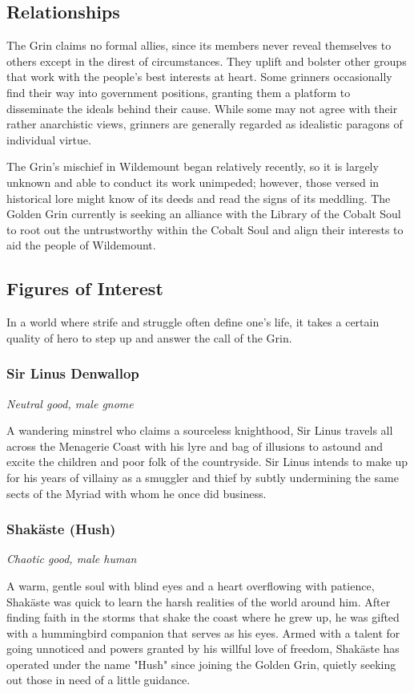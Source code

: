 \documentclass[10pt,a4paper,twoside,bg=print,twocolumn,openany,nodeprecatedcode]{dndbook}
\begin{document}
\subsection{Relationships}
The Grin claims no formal allies, since its members never reveal themselves to others except in the direst of circumstances. They uplift and bolster other groups that work with the people's best interests at heart. Some grinners occasionally find their way into government positions, granting them a platform to disseminate the ideals behind their cause. While some may not agree with their rather anarchistic views, grinners are generally regarded as idealistic paragons of individual virtue.

The Grin's mischief in Wildemount began relatively recently, so it is largely unknown and able to conduct its work unimpeded; however, those versed in historical lore might know of its deeds and read the signs of its meddling. The Golden Grin currently is seeking an alliance with the Library of the Cobalt Soul to root out the untrustworthy within the Cobalt Soul and align their interests to aid the people of Wildemount.

\subsection{Figures of Interest}
In a world where strife and struggle often define one's life, it takes a certain quality of hero to step up and answer the call of the Grin.

\subsubsection{Sir Linus Denwallop}
\textit{Neutral good, male gnome}

A wandering minstrel who claims a sourceless knighthood, Sir Linus travels all across the Menagerie Coast with his lyre and bag of illusions to astound and excite the children and poor folk of the countryside. Sir Linus intends to make up for his years of villainy as a smuggler and thief by subtly undermining the same sects of the Myriad with whom he once did business.

\subsubsection{Shakäste (Hush)}
\textit{Chaotic good, male human}

A warm, gentle soul with blind eyes and a heart overflowing with patience, Shakäste was quick to learn the harsh realities of the world around him. After finding faith in the storms that shake the coast where he grew up, he was gifted with a hummingbird companion that serves as his eyes. Armed with a talent for going unnoticed and powers granted by his willful love of freedom, Shakäste has operated under the name "Hush" since joining the Golden Grin, quietly seeking out those in need of a little guidance.
\end{document}
